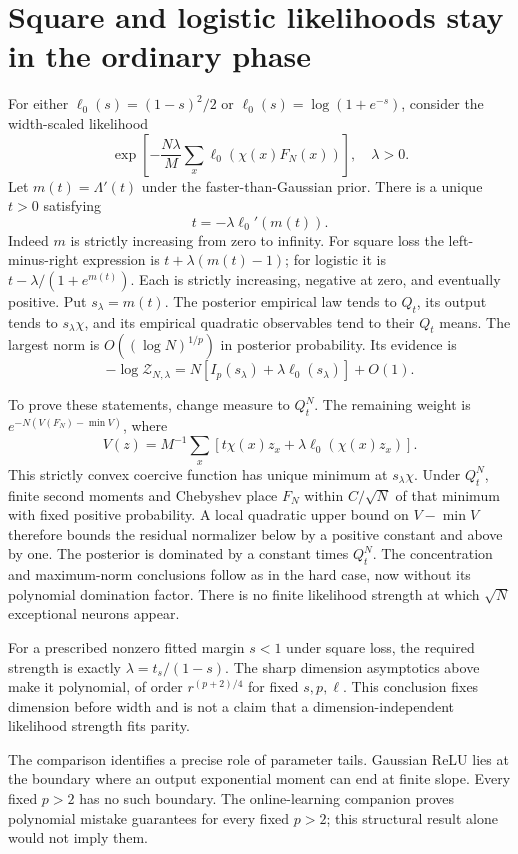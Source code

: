 \documentclass[11pt]{article}
\begin{document}
\section{Square and logistic likelihoods stay in the ordinary phase}
For either $\ell_0(s)=(1-s)^2/2$ or
$\ell_0(s)=\log(1+e^{-s})$, consider the width-scaled likelihood
\[
 \exp\left[-\frac{N\lambda}{M}\sum_x
                   \ell_0(\chi(x)F_N(x))\right],\quad\lambda>0.
\]
Let $m(t)=\Lambda'(t)$ under the faster-than-Gaussian prior. There is
a unique $t>0$ satisfying
\[
 t=-\lambda\ell_0'(m(t)).
\]
Indeed $m$ is strictly increasing from zero to infinity. For square
loss the left-minus-right expression is $t+\lambda(m(t)-1)$;
for logistic it is $t-\lambda/(1+e^{m(t)})$. Each is strictly
increasing, negative at zero, and eventually positive.
Put $s_\lambda=m(t)$. The posterior empirical law tends to $Q_t$,
its output tends to $s_\lambda\chi$, and its empirical quadratic
observables tend to their $Q_t$ means. The largest norm is
$O((\log N)^{1/p})$ in posterior probability. Its evidence is
\[
 -\log\mathcal Z_{N,\lambda}
 =N[I_p(s_\lambda)+\lambda\ell_0(s_\lambda)]+O(1).
\]

To prove these statements, change measure to $Q_t^N$. The remaining
weight is $e^{-N(V(F_N)-\min V)}$, where
\[
 V(z)=M^{-1}\sum_x[t\chi(x)z_x+\lambda\ell_0(\chi(x)z_x)].
\]
This strictly convex coercive function has unique minimum at
$s_\lambda\chi$. Under $Q_t^N$, finite second moments and Chebyshev
place $F_N$ within $C/\sqrt N$ of that minimum with fixed positive
probability. A local quadratic upper bound on $V-\min V$ therefore
bounds the residual normalizer below by a positive constant and above
by one. The posterior is dominated by a constant times $Q_t^N$.
The concentration and maximum-norm conclusions follow as in the hard
case, now without its polynomial domination factor. There is no finite
likelihood strength at which $\sqrt N$ exceptional neurons appear.

For a prescribed nonzero fitted margin $s<1$ under square loss, the
required strength is exactly $\lambda=t_s/(1-s)$. The sharp dimension
asymptotics above make it polynomial, of order $r^{(p+2)/4}$ for fixed
$s,p,\ell$. This conclusion fixes dimension before width and is not a
claim that a dimension-independent likelihood strength fits parity.

The comparison identifies a precise role of parameter tails. Gaussian
ReLU lies at the boundary where an output exponential moment can end
at finite slope. Every fixed $p>2$ has no such boundary. The online-learning
companion proves polynomial mistake guarantees for every fixed $p>2$;
this structural result alone would not imply them.
\end{document}
